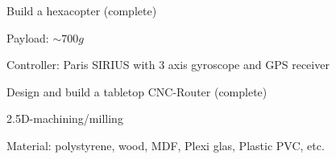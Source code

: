 \begin{cventries}
  \cventry
    {} %
    {Build a hexacopter (complete)} %
    {} %
    {} %
    {\vspace{-12pt}
      \begin{cvitems} %
        \item {Payload: $ \sim 700g$}
        \item {Controller: Paris SIRIUS with 3 axis gyroscope and GPS receiver}
      \end{cvitems}
    }

  \cventry
    {} %
    {Design and build a tabletop CNC-Router (complete)} %
    {} %
    {} %
    {\vspace{-12pt}
      \begin{cvitems} %
        \item {2.5D-machining/milling}
        \item {Material: polystyrene, wood, MDF, Plexi glas, Plastic PVC, etc.}
      \end{cvitems}
    }

\end{cventries}
